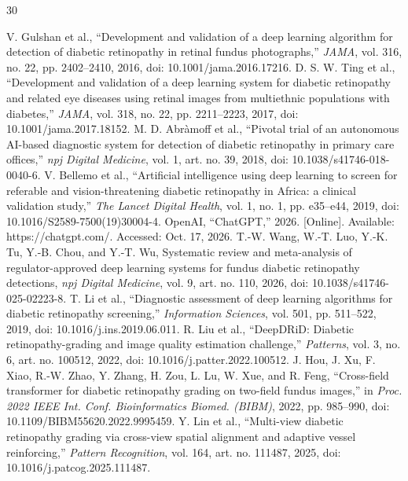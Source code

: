 \documentclass{ieeeaccess}
\begin{document}
\begin{thebibliography}{30}

 V. Gulshan et al., ``Development and validation of a deep learning algorithm for detection of diabetic retinopathy in retinal fundus photographs,'' \emph{JAMA}, vol. 316, no. 22, pp. 2402--2410, 2016, doi: 10.1001/jama.2016.17216.
 D. S. W. Ting et al., ``Development and validation of a deep learning system for diabetic retinopathy and related eye diseases using retinal images from multiethnic populations with diabetes,'' \emph{JAMA}, vol. 318, no. 22, pp. 2211--2223, 2017, doi: 10.1001/jama.2017.18152.
 M. D. Abr\`amoff et al., ``Pivotal trial of an autonomous AI-based diagnostic system for detection of diabetic retinopathy in primary care offices,'' \emph{npj Digital Medicine}, vol. 1, art. no. 39, 2018, doi: 10.1038/s41746-018-0040-6.
 V. Bellemo et al., ``Artificial intelligence using deep learning to screen for referable and vision-threatening diabetic retinopathy in Africa: a clinical validation study,'' \emph{The Lancet Digital Health}, vol. 1, no. 1, pp. e35--e44, 2019, doi: 10.1016/S2589-7500(19)30004-4.
 OpenAI, ``ChatGPT,'' 2026. [Online]. Available: https://chatgpt.com/. Accessed: Oct. 17, 2026.
 T.-W. Wang, W.-T. Luo, Y.-K. Tu, Y.-B. Chou, and Y.-T. Wu, Systematic review and meta-analysis of regulator-approved deep learning systems for fundus diabetic retinopathy detections, \emph{npj Digital Medicine}, vol. 9, art. no. 110, 2026, doi: 10.1038/s41746-025-02223-8.
 T. Li et al., ``Diagnostic assessment of deep learning algorithms for diabetic retinopathy screening,'' \emph{Information Sciences}, vol. 501, pp. 511--522, 2019, doi: 10.1016/j.ins.2019.06.011.
 R. Liu et al., ``DeepDRiD: Diabetic retinopathy-grading and image quality estimation challenge,'' \emph{Patterns}, vol. 3, no. 6, art. no. 100512, 2022, doi: 10.1016/j.patter.2022.100512.
 J. Hou, J. Xu, F. Xiao, R.-W. Zhao, Y. Zhang, H. Zou, L. Lu, W. Xue, and R. Feng, ``Cross-field transformer for diabetic retinopathy grading on two-field fundus images,'' in \emph{Proc. 2022 IEEE Int. Conf. Bioinformatics Biomed. (BIBM)}, 2022, pp. 985--990, doi: 10.1109/BIBM55620.2022.9995459.
 Y. Lin et al., ``Multi-view diabetic retinopathy grading via cross-view spatial alignment and adaptive vessel reinforcing,'' \emph{Pattern Recognition}, vol. 164, art. no. 111487, 2025, doi: 10.1016/j.patcog.2025.111487.

\end{thebibliography}
\end{document}
